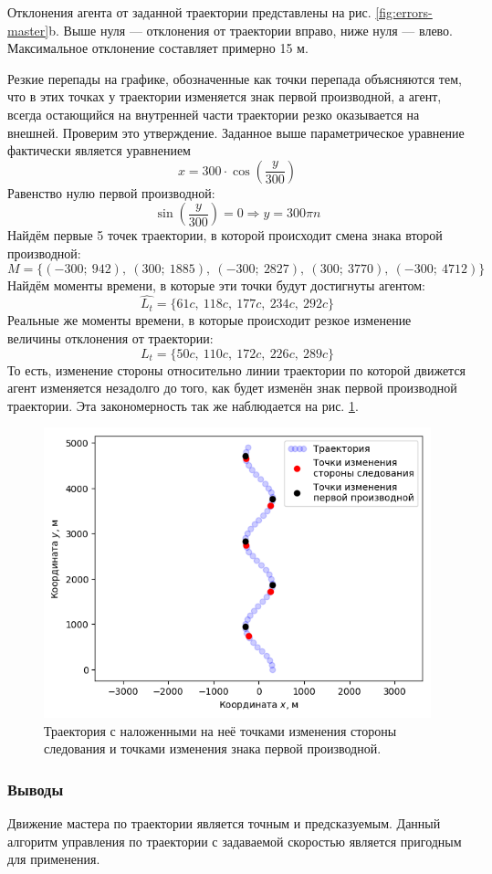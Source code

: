 \documentclass[a4paper, 14pt]{extarticle}
\let\Oldsubsubsection\subsubsection
\renewcommand{\subsubsection}{\FloatBarrier\Oldsubsubsection}
\begin{document}
Отклонения агента от заданной траектории представлены на рис. \ref{fig:errors-master}b. Выше нуля — отклонения от траектории вправо, ниже нуля — влево. Максимальное отклонение составляет примерно 15 м. \par
Резкие перепады на графике, обозначенные как точки перепада объясняются тем, что в этих точках у траектории изменяется знак первой производной, а агент, всегда остающийся на внутренней части траектории резко оказывается на внешней. Проверим это утверждение. Заданное выше параметрическое уравнение фактически является уравнением $$x = 300 \cdot \cos(\frac{y}{300})$$
Равенство нулю первой производной:
$$\sin(\frac{y}{300}) = 0 \Rightarrow y = 300 \pi n$$
Найдём первые 5 точек траектории, в которой происходит смена знака второй производной: $$M = \Big\{(-300; \ 942), \ (300; \ 1885), \ (-300; \ 2827), \ (300; \ 3770), \ (-300; \ 4712)\Big\}$$
Найдём моменты времени, в которые эти точки будут достигнуты агентом:
$$\hat{L_t} = \Big\{ 61c, \ 118c, \ 177c, \ 234c, \ 292c \Big\}$$
Реальные же моменты времени, в которые происходит резкое изменение величины отклонения от траектории:
$${L_t} = \Big\{ 50c, \ 110c, \ 172c, \ 226c, \ 289c \Big\}$$
То есть, изменение стороны относительно линии траектории по которой движется агент изменяется незадолго до того, как будет изменён знак первой производной траектории. Эта закономерность так же наблюдается на рис. \ref{fig:master-trajectory-changes-2}. \par
\begin{figure}[!htbp]
	\centering
	\includegraphics[width=0.5\linewidth]{master-trajectory-changes-2}
	\caption{Траектория с наложенными на неё точками изменения стороны следования и точками изменения знака первой производной.}
	\label{fig:master-trajectory-changes-2}
\end{figure}

\subsubsection{Выводы}
Движение мастера по траектории является точным и предсказуемым. Данный алгоритм управления по траектории с задаваемой скоростью является пригодным для применения.
\end{document}
